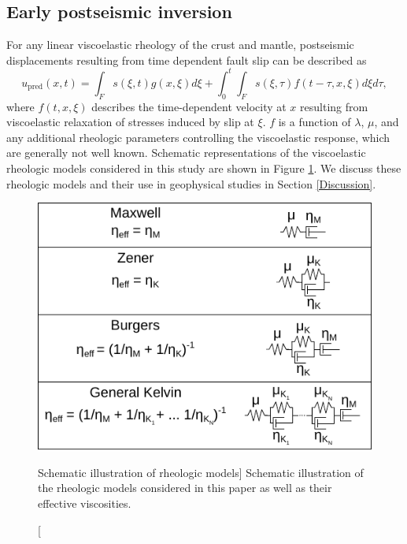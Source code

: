 \subsection{Early postseismic inversion}\label{ch3:sec:InitialInversion}
For any linear viscoelastic rheology of the crust and mantle,
postseismic displacements resulting from time dependent fault slip can
be described as
\begin{equation}\label{GeneralForward}
  u_\mathrm{pred}(x,t) = \int_F s(\xi,t)g(x,\xi)d\xi + 
           \int_0^t\int_F s(\xi,\tau) f(t-\tau,x,\xi) d\xi d\tau,
\end{equation}
where $f(t,x,\xi)$ describes the time-dependent velocity at $x$
resulting from viscoelastic relaxation of stresses induced by slip at
$\xi$. $f$ is a function of $\lambda$, $\mu$, and any additional
rheologic parameters controlling the viscoelastic response, which are
generally not well known. Schematic representations of the
viscoelastic rheologic models considered in this study are shown in
Figure \ref{ch3:fig:Rheology}.  We discuss these rheologic models and
their use in geophysical studies in Section \ref{Discussion}.

\begin{figure}
\includegraphics[scale=1.0]{ch3/figures/2016jb013114-f08}
\caption
[Schematic illustration of rheologic models]
{Schematic illustration of the rheologic models considered in
this paper as well as their effective viscosities.}
\label{ch3:fig:Rheology}
\end{figure}

